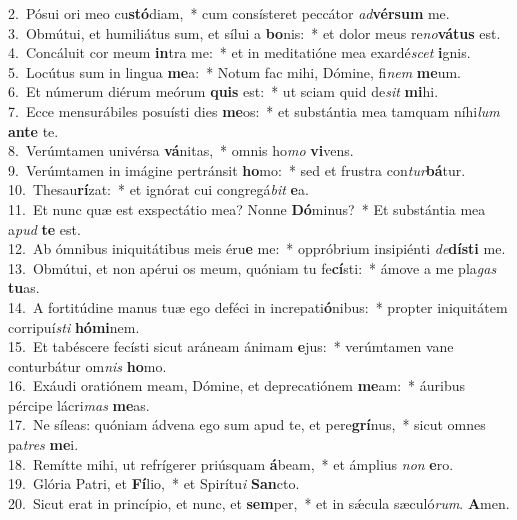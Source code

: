 {2.~}Pósui ori meo cu\textbf{stó}diam,~* cum consísteret peccátor \textit{ad}\textbf{vér}\textbf{sum} me.\\
{3.~}Obmútui, et humiliátus sum, et sílui a \textbf{bo}nis:~* et dolor meus re\textit{no}\textbf{vá}\textbf{tus} est.\\
{4.~}Concáluit cor meum \textbf{in}tra me:~* et in meditatióne mea exardé\textit{scet} \textbf{i}gnis.\\
{5.~}Locútus sum in lingua \textbf{me}a:~* Notum fac mihi, Dómine, fi\textit{nem} \textbf{me}um.\\
{6.~}Et númerum diérum meórum \textbf{quis} est:~* ut sciam quid de\textit{sit} \textbf{mi}hi.\\
{7.~}Ecce mensurábiles posuísti dies \textbf{me}os:~* et substántia mea tamquam níhi\textit{lum} \textbf{an}\textbf{te} te.\\
{8.~}Verúmtamen univérsa \textbf{vá}nitas,~* omnis ho\textit{mo} \textbf{vi}vens.\\
{9.~}Verúmtamen in imágine pertránsit \textbf{ho}mo:~* sed et frustra con\textit{tur}\textbf{bá}tur.\\
{10.~}Thesau\textbf{rí}zat:~* et ignórat cui congregá\textit{bit} \textbf{e}a.\\
{11.~}Et nunc quæ est exspectátio mea? Nonne \textbf{Dó}minus?~* Et substántia mea a\textit{pud} \textbf{te} est.\\
{12.~}Ab ómnibus iniquitátibus meis éru\textbf{e} me:~* oppróbrium insipiénti \textit{de}\textbf{dí}\textbf{sti} me.\\
{13.~}Obmútui, et non apérui os meum, quóniam tu fe\textbf{cí}sti:~* ámove a me pla\textit{gas} \textbf{tu}as.\\
{14.~}A fortitúdine manus tuæ ego deféci in increpati\textbf{ó}nibus:~* propter iniquitátem corripuí\textit{sti} \textbf{hó}\textbf{mi}nem.\\
{15.~}Et tabéscere fecísti sicut aráneam ánimam \textbf{e}jus:~* verúmtamen vane conturbátur om\textit{nis} \textbf{ho}mo.\\
{16.~}Exáudi oratiónem meam, Dómine, et deprecatiónem \textbf{me}am:~* áuribus pércipe lácri\textit{mas} \textbf{me}as.\\
{17.~}Ne síleas: quóniam ádvena ego sum apud te, et pere\textbf{grí}nus,~* sicut omnes pa\textit{tres} \textbf{me}i.\\
{18.~}Remítte mihi, ut refrígerer priúsquam \textbf{á}beam,~* et ámplius \textit{non} \textbf{e}ro.\\
{19.~}Glória Patri, et \textbf{Fí}lio,~* et Spirítu\textit{i} \textbf{San}cto.\\
{20.~}Sicut erat in princípio, et nunc, et \textbf{sem}per,~* et in sǽcula sæculó\textit{rum}. \textbf{A}men.\\
